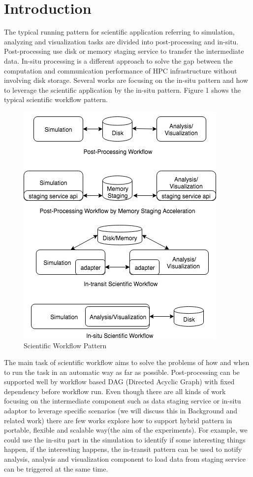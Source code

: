 \section{Introduction}

The typical running pattern for scientific application referring to simulation, analyzing and visualization tasks are divided into post-processing and in-situ\cite{childs2012situ}. Post-processing use disk or memory staging service to transfer the intermediate data. In-situ processing is a different approach to solve the gap between the computation and communication performance of HPC infrastructure without involving disk storage\cite{childs2012situ}. Several works are focusing on the in-situ pattern and how to leverage the scientific application\cite{bauer2016situ,oldfield2014evaluation} by the in-situ pattern. Figure 1 shows the typical scientific workflow pattern.

\begin{figure} 
\centering
\includegraphics[width=0.75\linewidth]{./figure/scientificworkflowpattern.jpg}
\caption{Scientific Workflow Pattern}
 \label{fg:state}
\end{figure} 


The main task of scientific workflow aims to solve the problems of how and when to run the task in an automatic way as far as possible. Post-processing can be supported well by workflow based DAG (Directed Acyclic Graph) with fixed dependency before workflow run. Even though there are all kinds of work focusing on the intermediate component such as data staging service or in-situ adaptor to leverage specific scenarios (we will discuss this in Background and related work) there are few works explore how to support hybrid pattern in portable, flexible and scalable way(the aim of the experiments). For example, we could use the in-situ part in the simulation to identify if some interesting things happen, if the interesting happens, the in-transit pattern can be used to notify analysis, analysis and visualization component to load data from staging service can be triggered at the same time. 

